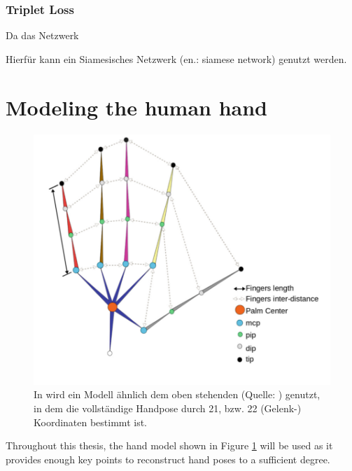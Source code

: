 	 
	 
%	 	
	 
	 	 \subsubsection{Triplet Loss}
	 Da das Netzwerk 
	 
	 
	 
	 Hierfür kann ein Siamesisches Netzwerk (en.: siamese network) genutzt werden. 


	
	
\section { Modeling the human hand }
	
	\begin{figure}
		\centering
		\includegraphics[width=0.7\linewidth]{Ressourcen/malik2018_hand_model}
		\caption[Handmodell nach \cite{Malik2018b}]{In \cite{Malik2018b} wird ein Modell ähnlich dem oben stehenden (Quelle: \cite{Malik2018b}) genutzt, in dem die vollständige Handpose durch 21, bzw. 22 (Gelenk-) Koordinaten bestimmt ist.}
		\label{fig:malik2018handmodel}
	\end{figure}
	Throughout this thesis, the hand model shown in Figure \ref{fig:malik2018handmodel} will be used as it provides enough key points to reconstruct hand poses to a sufficient degree.
	
